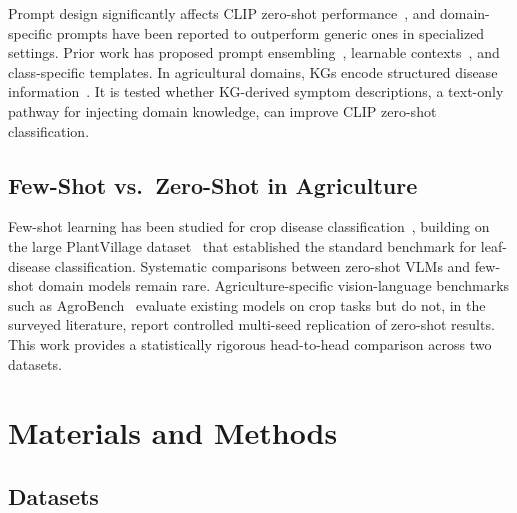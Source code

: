\documentclass[10pt,a4paper]{article}
\begin{document}
Prompt design significantly affects CLIP zero-shot performance~\cite{zhou2022learning,liu2025finegrained}, and domain-specific prompts have been reported to outperform generic ones in specialized settings.
Prior work has proposed prompt ensembling~\cite{radford2021learning}, learnable contexts~\cite{zhou2022learning}, and class-specific templates.
In agricultural domains, KGs encode structured disease information~\cite{cropdpkg2025}.
It is tested whether KG-derived symptom descriptions, a text-only pathway for injecting domain knowledge, can improve CLIP zero-shot classification.

\subsection{Few-Shot vs.\ Zero-Shot in Agriculture}

Few-shot learning has been studied for crop disease classification~\cite{argueso2020fewshot,liang2021cotton}, building on the large PlantVillage dataset~\cite{plantvillage2016} that established the standard benchmark for leaf-disease classification.
Systematic comparisons between zero-shot VLMs and few-shot domain models remain rare.
Agriculture-specific vision-language benchmarks such as AgroBench~\cite{shinoda2025agrobench} evaluate existing models on crop tasks but do not, in the surveyed literature, report controlled multi-seed replication of zero-shot results.
This work provides a statistically rigorous head-to-head comparison across two datasets.

\section{Materials and Methods}
\label{sec:method}

\subsection{Datasets}
\end{document}
